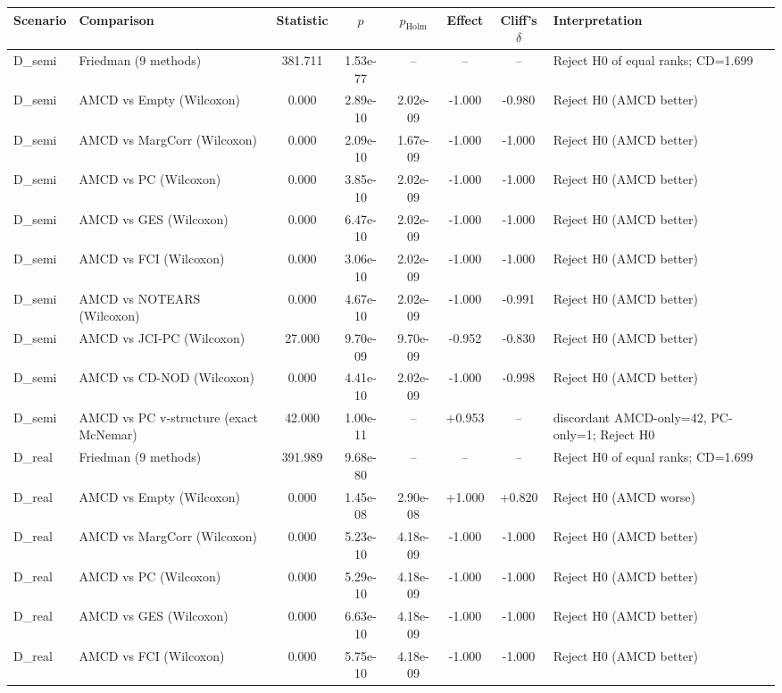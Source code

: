 \begin{tabular}{llcccccp{4.2cm}}
\toprule
Scenario & Comparison & Statistic & $p$ & $p_{\mathrm{Holm}}$ & Effect & Cliff's $\delta$ & Interpretation \\
\midrule
D\_semi & Friedman (9 methods) & 381.711 & 1.53e-77 & -- & -- & -- & Reject H0 of equal ranks; CD=1.699 \\
D\_semi & AMCD vs Empty (Wilcoxon) & 0.000 & 2.89e-10 & 2.02e-09 & -1.000 & -0.980 & Reject H0 (AMCD better) \\
D\_semi & AMCD vs MargCorr (Wilcoxon) & 0.000 & 2.09e-10 & 1.67e-09 & -1.000 & -1.000 & Reject H0 (AMCD better) \\
D\_semi & AMCD vs PC (Wilcoxon) & 0.000 & 3.85e-10 & 2.02e-09 & -1.000 & -1.000 & Reject H0 (AMCD better) \\
D\_semi & AMCD vs GES (Wilcoxon) & 0.000 & 6.47e-10 & 2.02e-09 & -1.000 & -1.000 & Reject H0 (AMCD better) \\
D\_semi & AMCD vs FCI (Wilcoxon) & 0.000 & 3.06e-10 & 2.02e-09 & -1.000 & -1.000 & Reject H0 (AMCD better) \\
D\_semi & AMCD vs NOTEARS (Wilcoxon) & 0.000 & 4.67e-10 & 2.02e-09 & -1.000 & -0.991 & Reject H0 (AMCD better) \\
D\_semi & AMCD vs JCI-PC (Wilcoxon) & 27.000 & 9.70e-09 & 9.70e-09 & -0.952 & -0.830 & Reject H0 (AMCD better) \\
D\_semi & AMCD vs CD-NOD (Wilcoxon) & 0.000 & 4.41e-10 & 2.02e-09 & -1.000 & -0.998 & Reject H0 (AMCD better) \\
D\_semi & AMCD vs PC v-structure (exact McNemar) & 42.000 & 1.00e-11 & -- & +0.953 & -- & discordant AMCD-only=42, PC-only=1; Reject H0 \\
D\_real & Friedman (9 methods) & 391.989 & 9.68e-80 & -- & -- & -- & Reject H0 of equal ranks; CD=1.699 \\
D\_real & AMCD vs Empty (Wilcoxon) & 0.000 & 1.45e-08 & 2.90e-08 & +1.000 & +0.820 & Reject H0 (AMCD worse) \\
D\_real & AMCD vs MargCorr (Wilcoxon) & 0.000 & 5.23e-10 & 4.18e-09 & -1.000 & -1.000 & Reject H0 (AMCD better) \\
D\_real & AMCD vs PC (Wilcoxon) & 0.000 & 5.29e-10 & 4.18e-09 & -1.000 & -1.000 & Reject H0 (AMCD better) \\
D\_real & AMCD vs GES (Wilcoxon) & 0.000 & 6.63e-10 & 4.18e-09 & -1.000 & -1.000 & Reject H0 (AMCD better) \\
D\_real & AMCD vs FCI (Wilcoxon) & 0.000 & 5.75e-10 & 4.18e-09 & -1.000 & -1.000 & Reject H0 (AMCD better) \\

\end{tabular}
